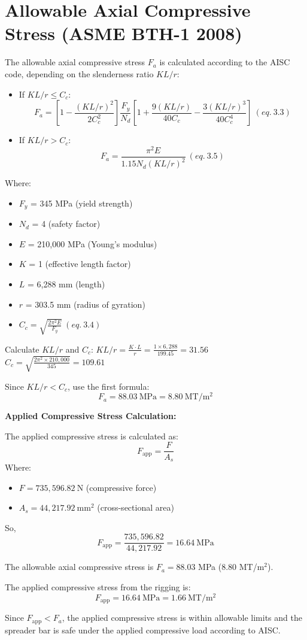 \documentclass[12pt]{article}
\begin{document}
\section{Allowable Axial Compressive Stress (ASME BTH-1 2008)}

The allowable axial compressive stress $F_a$ is calculated according to the AISC code, depending on the slenderness ratio $KL/r$:

\begin{itemize}
  \item If $KL/r \leq C_c$:
  \[
  F_a = \left[1 - \frac{(KL/r)^2}{2C_c^2}\right] \frac{F_y}{N_d} \left[1 + \frac{9(KL/r)}{40C_c} - \frac{3(KL/r)^3}{40C_c^4}\right] \ (eq. \ 3.3)
  \]
  \item If $KL/r > C_c$:
  \[
  F_a = \frac{\pi^2 E}{1.15 N_d (KL/r)^2} \ (eq. \ 3.5)
  \]
\end{itemize}

Where:
\begin{itemize}
  \item $F_y$ = 345 MPa (yield strength)
  \item $N_d$ = 4 (safety factor)
  \item $E$ = 210,000 MPa (Young's modulus)
  \item $K$ = 1 (effective length factor)
  \item $L$ = 6,288 mm (length)
  \item $r$ = 303.5 mm (radius of gyration)
  \item $C_c = \sqrt{\frac{2\pi^2 E}{F_y}} \ (eq. \ 3.4)$ 
\end{itemize}

Calculate $KL/r$ and $C_c$:
\(
KL/r = \frac{K \cdot L}{r} = \frac{1 \times 6,288}{199.45} = 31.56
\)\\
\(
C_c = \sqrt{\frac{2\pi^2 \times 210,000}{345}} = 109.61
\)

Since $KL/r < C_c$, use the first formula:
\[
F_a = 88.03\ \mathrm{MPa} = 8.80\ \mathrm{MT/m^2}
\]

\textbf{Applied Compressive Stress Calculation:}

The applied compressive stress is calculated as:
\[
F_{\text{app}} = \frac{F}{A_s}
\]
Where:
\begin{itemize}
  \item $F = 735,596.82\ \mathrm{N}$ (compressive force)
  \item $A_s = 44,217.92\ \mathrm{mm}^2$ (cross-sectional area)
\end{itemize}
So,
\[
F_{\text{app}} = \frac{735,596.82}{44,217.92} = 16.64\ \mathrm{MPa}
\]

The allowable axial compressive stress is $F_a = 88.03$ MPa ($8.80$ MT/m$^2$).

The applied compressive stress from the rigging is:
\[
F_{\text{app}} = 16.64\ \mathrm{MPa} = 1.66\ \mathrm{MT/m^2}
\]

Since $F_{\text{app}} < F_a$, the applied compressive stress is within allowable limits and the spreader bar is safe under the applied compressive load according to AISC.
\end{document}
